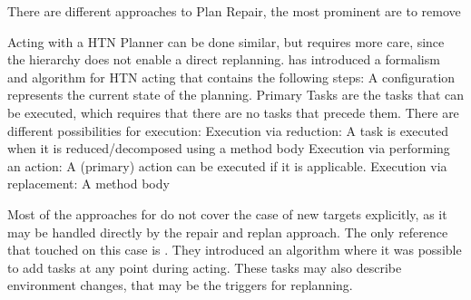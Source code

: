 There are different approaches to Plan Repair, the most prominent are to remove 

Acting with a HTN Planner can be done similar, but requires more care, since the hierarchy does not enable a direct replanning.
\cite{desilvaHTNActingFormalism2018} has introduced a formalism and algorithm for HTN acting that contains the following steps:
A configuration represents the current state of the planning.
Primary Tasks are the tasks that can be executed, which requires that there are no tasks that precede them.
There are different possibilities for execution:
Execution via reduction: A task is executed when it is reduced/decomposed using a method body
Execution via performing an action: A (primary) action can be executed if it is applicable.
Execution via replacement: A method body

Most of the approaches for do not cover the case of new targets explicitly, as it may be handled directly by the repair and replan approach.
The only reference that touched on this case is \cite{desilvaHTNActingFormalism2018}.
They introduced an algorithm where it was possible to add tasks at any point during acting.
These tasks may also describe environment changes, that may be the triggers for replanning.


